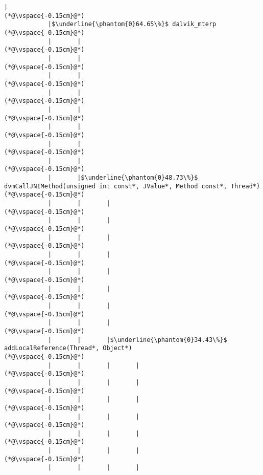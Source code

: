 \begin{lstlisting}[caption=20 viiteparametria Java$\to$C , label=profile:J2CBenchmark00206, numberbychapter=true, frame=lines, float, floatplacement=t]
            |
(*@\vspace{-0.15cm}@*)
            |$\underline{\phantom{0}64.65\%}$ dalvik_mterp
(*@\vspace{-0.15cm}@*)
            |       |
(*@\vspace{-0.15cm}@*)
            |       |
(*@\vspace{-0.15cm}@*)
            |       |
(*@\vspace{-0.15cm}@*)
            |       |
(*@\vspace{-0.15cm}@*)
            |       |
(*@\vspace{-0.15cm}@*)
            |       |
(*@\vspace{-0.15cm}@*)
            |       |
(*@\vspace{-0.15cm}@*)
            |       |
(*@\vspace{-0.15cm}@*)
            |       |$\underline{\phantom{0}48.73\%}$ dvmCallJNIMethod(unsigned int const*, JValue*, Method const*, Thread*)
(*@\vspace{-0.15cm}@*)
            |       |       |
(*@\vspace{-0.15cm}@*)
            |       |       |
(*@\vspace{-0.15cm}@*)
            |       |       |
(*@\vspace{-0.15cm}@*)
            |       |       |
(*@\vspace{-0.15cm}@*)
            |       |       |
(*@\vspace{-0.15cm}@*)
            |       |       |
(*@\vspace{-0.15cm}@*)
            |       |       |
(*@\vspace{-0.15cm}@*)
            |       |       |
(*@\vspace{-0.15cm}@*)
            |       |       |$\underline{\phantom{0}34.43\%}$ addLocalReference(Thread*, Object*)
(*@\vspace{-0.15cm}@*)
            |       |       |       |
(*@\vspace{-0.15cm}@*)
            |       |       |       |
(*@\vspace{-0.15cm}@*)
            |       |       |       |
(*@\vspace{-0.15cm}@*)
            |       |       |       |
(*@\vspace{-0.15cm}@*)
            |       |       |       |
(*@\vspace{-0.15cm}@*)
            |       |       |       |
(*@\vspace{-0.15cm}@*)
            |       |       |       |

\end{lstlisting}
